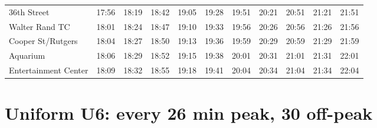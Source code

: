 \begin{center}
\begin{tabular}{@{}lrrrrrrrrrr@{}}
36th Street & 17:56 & 18:19 & 18:42 & 19:05 & 19:28 & 19:51 & 20:21 & 20:51 & 21:21 & 21:51 \\
Walter Rand TC & 18:01 & 18:24 & 18:47 & 19:10 & 19:33 & 19:56 & 20:26 & 20:56 & 21:26 & 21:56 \\
Cooper St/Rutgers & 18:04 & 18:27 & 18:50 & 19:13 & 19:36 & 19:59 & 20:29 & 20:59 & 21:29 & 21:59 \\
Aquarium & 18:06 & 18:29 & 18:52 & 19:15 & 19:38 & 20:01 & 20:31 & 21:01 & 21:31 & 22:01 \\
Entertainment Center & 18:09 & 18:32 & 18:55 & 19:18 & 19:41 & 20:04 & 20:34 & 21:04 & 21:34 & 22:04 \\
\bottomrule\end{tabular}\end{center}
\clearpage
\section{Uniform U6: every 26 min peak, 30 off-peak}\label{tt:uniform_U6}
